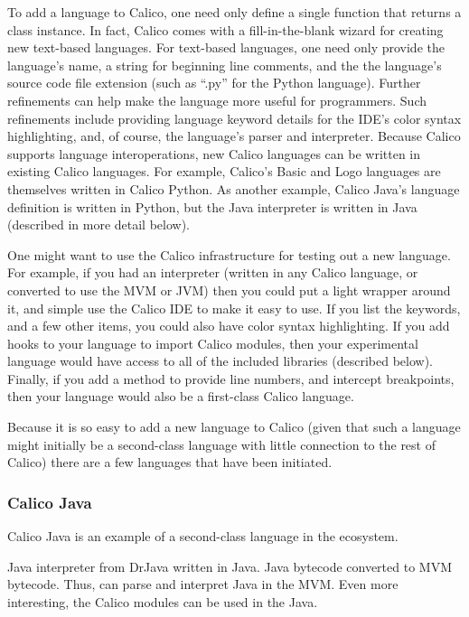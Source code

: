 \documentclass[preprint]{sigplanconf}
\begin{document}
To add a language to Calico, one need only define a single function that returns a class instance. In fact, Calico comes with a fill-in-the-blank wizard for creating new text-based languages. For text-based languages, one need only provide the language's name, a string for beginning line comments, and the the language's source code file extension (such as ``.py'' for the Python language). Further refinements can help make the language more useful for programmers. Such refinements include providing language keyword details for the IDE's color syntax highlighting, and, of course, the language's parser and interpreter. Because Calico supports language interoperations, new Calico languages can be written in existing Calico languages. For example, Calico's Basic and Logo languages are themselves written in Calico Python. As another example, Calico Java's language definition is written in Python, but the Java interpreter is written in Java (described in more detail below).


One might want to use the Calico infrastructure for testing out a new language. For example, if you had an interpreter (written in any Calico language, or converted to use the MVM or JVM) then you could put a light wrapper around it, and simple use the Calico IDE to make it easy to use. If you list the keywords, and a few other items, you could also have color syntax highlighting. If you add hooks to your language to import Calico modules, then your experimental language would have access to all of the included libraries (described below). Finally, if you add a method to provide line numbers, and intercept breakpoints, then your language would also be a first-class Calico language.


Because it is so easy to add a new language to Calico (given that such a language might initially be a second-class language with little connection to the rest of Calico) there are a few languages that have been initiated.


\subsubsection{Calico Java}


Calico Java is an example of a second-class language in the ecosystem.


Java interpreter from DrJava written in Java. Java bytecode converted to MVM bytecode. Thus, can parse and interpret Java in the MVM. Even more interesting, the Calico modules can be used in the Java.
\end{document}
